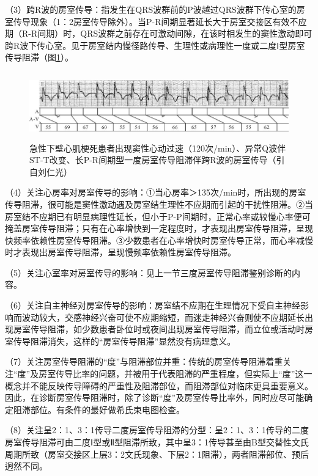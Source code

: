 （3）跨R波的房室传导：指发生在QRS波群前的P波越过QRS波群下传心室的房室传导现象（1：2房室传导除外）。当P-R间期显著延长大于房室交接区有效不应期（R-R间期）时，QRS波群之前存在可激动间隙，在该时相发生的窦性激动即可跨R波下传心室。见于房室结内慢径路传导、生理性或病理性一度或二度Ⅰ型房室传导阻滞（图\ref{fig20-19}）。

\begin{figure}[!htbp]
 \centering
 \includegraphics[width=5.82292in,height=1.14583in]{./images/Image00348.jpg}
 \captionsetup{justification=centering}
 \caption{急性下壁心肌梗死患者出现窦性心动过速（120次/min）、异常Q波伴ST-T改变、长P-R间期型一度房室传导阻滞伴跨R波的房室传导（引自刘仁光）}
 \label{fig20-19}
  \end{figure} 

（4）关注心房率对房室传导的影响：①当心房率＞135次/min时，所出现的房室传导阻滞，很可能是窦性激动遇及房室结生理性不应期而引起的干扰性阻滞。②当房室结不应期已有明显病理性延长，但小于P-P间期时，正常心率或较慢心率便可掩盖房室传导阻滞；只有在心率增快到一定程度时，才表现出房室传导阻滞，呈现快频率依赖性房室传导阻滞。③少数患者在心率增快时房室传导正常，而心率减慢时才表现出房室传导阻滞，呈现慢频率依赖性房室传导阻滞。

（5）关注心室率对房室传导的影响：见上一节三度房室传导阻滞鉴别诊断的内容。

（6）关注自主神经对房室传导的影响：房室结不应期在生理情况下受自主神经影响而波动较大，交感神经兴奋可使不应期缩短，而迷走神经兴奋则使不应期延长出现房室传导阻滞，如少数患者卧位时或夜间出现房室传导阻滞，而立位或活动时房室传导阻滞消失，这样的“房室传导阻滞”显然没有病理意义。

（7）关注房室传导阻滞的“度”与阻滞部位并重：传统的房室传导阻滞着重关注“度”及房室传导比率的问题，并被用于代表阻滞的严重程度，但实际上“度”这一概念并不能反映传导障碍的严重性及阻滞部位，而阻滞部位对临床更具重要意义。因此，在诊断房室传导阻滞时，除了诊断“度”及房室传导比率外，同时应尽可能确定阻滞部位。有条件的最好做希氏束电图检查。

（8）关注呈2：1、3：1传导二度房室传导阻滞的分型：呈2：1、3：1传导的二度房室传导阻滞可由二度Ⅰ型或Ⅱ型阻滞所致，其中呈3：1传导甚至由B型交替性文氏周期所致（房室交接区上层3：2文氏现象、下层2：1阻滞），两者阻滞部位、预后迥然不同。

